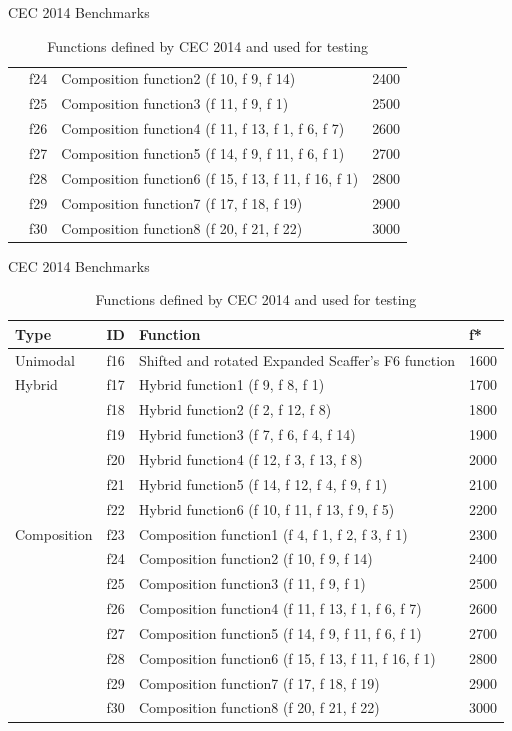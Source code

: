 \documentclass{beamer}
\begin{document}
\begin{frame}{CEC 2014 Benchmarks}
\begin{table}[]
\begin{tabular}{llll}
    & f24 & Composition function2 (f 10, f 9, f 14) & 2400 \\
    & f25 & Composition function3 (f 11, f 9, f 1) & 2500 \\
    & f26 & Composition function4 (f 11, f 13, f 1, f 6, f 7) & 2600 \\
    & f27 & Composition function5 (f 14, f 9, f 11, f 6, f 1) & 2700 \\
    & f28 & Composition function6 (f 15, f 13, f 11, f 16, f 1) & 2800 \\
    & f29 & Composition function7 (f 17, f 18, f 19) & 2900 \\
    & f30 & Composition function8 (f 20, f 21, f 22) & 3000
\end{tabular}
\caption{Functions defined by CEC 2014 and used for testing}
\end{table}
\end{frame}

\begin{frame}{CEC 2014 Benchmarks}
\begin{table}[]
\begin{tabular}{llll}
  \textbf{Type}
    & \textbf{ID} & \textbf{Function} & \textbf{f*} \\ \hline
  Unimodal
    & f16 & Shifted and rotated Expanded Scaffer's F6 function & 1600 \\
  Hybrid
    & f17 & Hybrid function1 (f 9, f 8, f 1) & 1700 \\
    & f18 & Hybrid function2 (f 2, f 12, f 8) & 1800 \\
    & f19 & Hybrid function3 (f 7, f 6, f 4, f 14) & 1900 \\
    & f20 & Hybrid function4 (f 12, f 3, f 13, f 8) & 2000 \\
    & f21 & Hybrid function5 (f 14, f 12, f 4, f 9, f 1) & 2100 \\
    & f22 & Hybrid function6 (f 10, f 11, f 13, f 9, f 5) & 2200 \\
  Composition
    & f23 & Composition function1 (f 4, f 1, f 2, f 3, f 1) & 2300 \\
    & f24 & Composition function2 (f 10, f 9, f 14) & 2400 \\
    & f25 & Composition function3 (f 11, f 9, f 1) & 2500 \\
    & f26 & Composition function4 (f 11, f 13, f 1, f 6, f 7) & 2600 \\
    & f27 & Composition function5 (f 14, f 9, f 11, f 6, f 1) & 2700 \\
    & f28 & Composition function6 (f 15, f 13, f 11, f 16, f 1) & 2800 \\
    & f29 & Composition function7 (f 17, f 18, f 19) & 2900 \\
    & f30 & Composition function8 (f 20, f 21, f 22) & 3000
\end{tabular}
\caption{Functions defined by CEC 2014 and used for testing}
\end{table}
\end{frame}
\end{document}
